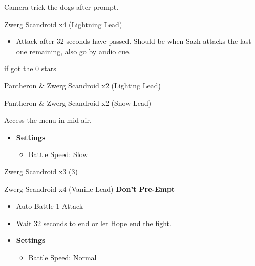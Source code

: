 	Camera trick the dogs after prompt.

	\begin{battle}[0:32]{Zwerg Scandroid x4 (Lightning Lead)}
		\begin{itemize}
			\item Attack after 32 seconds have passed. Should be when Sazh attacks the last one remaining, also go by audio cue.
		\end{itemize}
		 if got the 0 stars
	\end{battle}


	\begin{battle}[0:14]{Pantheron \& Zwerg Scandroid x2 (Lighting Lead)}
	\end{battle}


	\begin{battle}[0:14]{Pantheron \& Zwerg Scandroid x2 (Snow Lead)}
	\end{battle}
	Access the menu in mid-air.

	\begin{menu}
		\begin{itemize}
			\item \textbf{Settings}
			      \begin{itemize}
				      \item Battle Speed: Slow
			      \end{itemize}
		\end{itemize}
	\end{menu}
	
	\begin{battle}[0:23]{Zwerg Scandroid x3 (3)}
	\end{battle}

	\begin{battle}[0:32]{Zwerg Scandroid x4 (Vanille Lead) \textbf{Don't Pre-Empt}}
		\begin{itemize}
			\item Auto-Battle 1 Attack
			\item Wait 32 seconds to end or let Hope end the fight.
		\end{itemize}
	\end{battle}

	\begin{menu}
		\begin{itemize}
			\item \textbf{Settings}
			      \begin{itemize}
				      \item Battle Speed: Normal
			      \end{itemize}
		\end{itemize}
	\end{menu}

